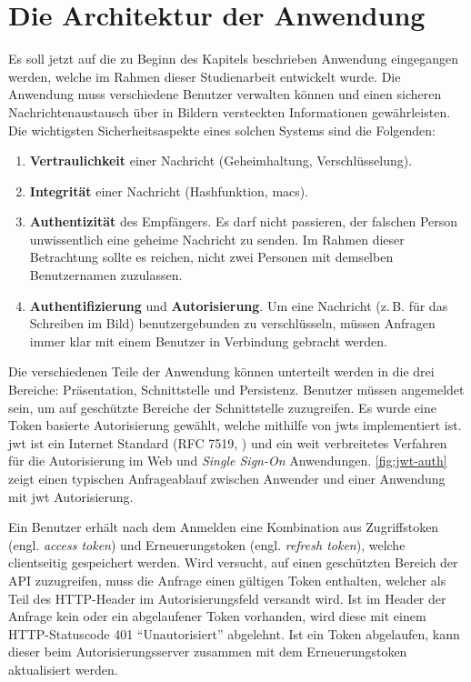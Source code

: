 

\newpage
\section{Die Architektur der Anwendung}
Es soll jetzt auf die zu Beginn des Kapitels beschrieben Anwendung
eingegangen werden, welche im Rahmen dieser Studienarbeit entwickelt wurde.
Die Anwendung muss verschiedene Benutzer verwalten können und
einen sicheren Nachrichtenaustausch über in Bildern
versteckten Informationen gewährleisten.
Die wichtigsten Sicherheitsaspekte eines
solchen Systems sind die Folgenden:
\begin{enumerate}
  \item \textbf{Vertraulichkeit} einer Nachricht (Geheimhaltung, Verschlüsselung).
  \item \textbf{Integrität} einer Nachricht (Hashfunktion, \acp{mac}).
  \item \textbf{Authentizität} des Empfängers. Es darf nicht passieren, der falschen Person
        unwissentlich eine geheime Nachricht zu senden. Im Rahmen dieser Betrachtung sollte
        es reichen, nicht zwei Personen mit demselben Benutzernamen zuzulassen.
  \item \textbf{Authentifizierung} und \textbf{Autorisierung}. Um eine Nachricht
        (z.\,B. für das Schreiben im Bild) benutzergebunden zu verschlüsseln,
        müssen Anfragen immer klar mit einem Benutzer in Verbindung gebracht werden.
\end{enumerate}

\noindent
Die verschiedenen Teile der Anwendung können unterteilt werden in die
drei Bereiche: Präsentation, Schnittstelle und Persistenz.
Benutzer müssen angemeldet sein, um auf geschützte Bereiche der Schnittstelle zuzugreifen.
Es wurde eine Token basierte Autorisierung gewählt, welche mithilfe von \acp{jwt}
implementiert ist. \ac{jwt} ist ein Internet Standard (RFC 7519, \cite{SITE:jwt}) und ein
weit verbreitetes Verfahren für die Autorisierung im Web und \textit{Single Sign-On} Anwendungen.
\autoref{fig:jwt-auth} zeigt einen typischen Anfrageablauf zwischen Anwender und einer Anwendung
mit \acs{jwt} Autorisierung.
\newpage



\noindent
Ein Benutzer erhält nach dem Anmelden eine Kombination aus Zugriffstoken
(engl. \textit{access token}) und Erneuerungstoken (engl. \textit{refresh token}),
welche clientseitig gespeichert werden.
Wird versucht, auf einen geschützten Bereich der API zuzugreifen, muss die Anfrage
einen gültigen Token enthalten, welcher als Teil des HTTP-Header im
Autorisierungsfeld versandt wird.
Ist im Header der Anfrage kein oder ein
abgelaufener Token vorhanden, wird diese mit einem HTTP-Statuscode 401 \enquote{Unautorisiert}
abgelehnt. Ist ein Token abgelaufen, kann dieser beim Autorisierungsserver
zusammen mit dem Erneuerungstoken aktualisiert werden.

